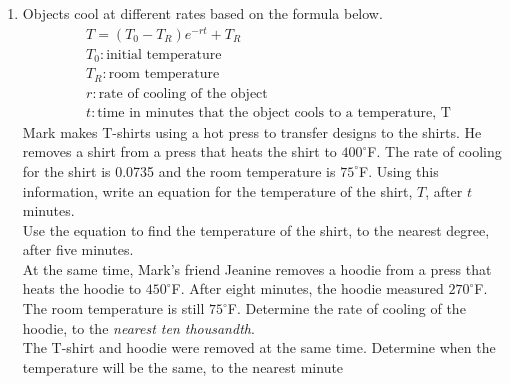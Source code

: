 \documentclass[12pt, twoside]{article}
\begin{document}
\begin{enumerate}[itemsep=0.5cm]
\newpage
\item Objects cool at different rates based on the formula below. %
\begin{align*}
&T = (T_0 - T_R)e^{-rt} + T_R \\
&T_0: \text{initial temperature} \\
&T_R: \text{room temperature} \\
&r: \text{rate of cooling of the object} \\
&t: \text{time in minutes that the object cools to a temperature, T}
\end{align*}
Mark makes T-shirts using a hot press to transfer designs to the shirts. He removes a shirt from
a press that heats the shirt to $400^\circ$F. The rate of cooling for the shirt is 0.0735 and the room temperature is $75^\circ$F. Using this information, write an equation for the temperature of the shirt,
$T$, after $t$ minutes. \\[4cm]
Use the equation to find the temperature of the shirt, to the nearest degree, after five minutes. \\[4cm]
At the same time, Mark’s friend Jeanine removes a hoodie from a press that heats the hoodie to $450^\circ$F. After eight minutes, the hoodie measured $270^\circ$F. The room temperature is still $75^\circ$F. Determine the rate of cooling of the hoodie, to the \emph{nearest ten thousandth}. \\[4cm]
The T-shirt and hoodie were removed at the same time. Determine when the temperature will be the same, to the nearest minute

\end{enumerate}
\end{document}
